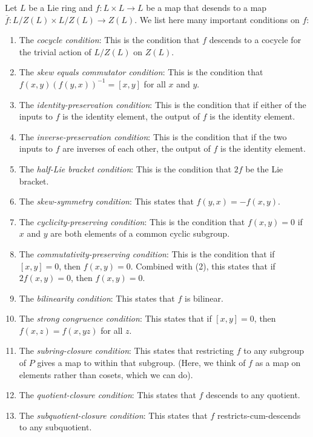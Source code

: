 \documentclass[10pt]{amsart}
\begin{document}
Let $L$ be a Lie ring and $f:L \times L \to L$ be a map that desends
to a map $\overline{f}: L/Z(L) \times L/Z(L) \to Z(L)$. We list here
many important conditions on $f$:

\begin{enumerate}
\item The {\em cocycle condition}: This is the condition that $f$
  descends to a cocycle for the trivial action of $L/Z(L)$ on $Z(L)$.
\item The {\em skew equals commutator condition}: This is the
  condition that $f(x,y)(f(y,x))^{-1} = [x,y]$ for all $x$ and $y$.
\item The {\em identity-preservation condition}: This is the condition
  that if either of the inputs to $f$ is the identity element, the
  output of $f$ is the identity element.
\item The {\em inverse-preservation condition}: This is the condition
  that if the two inputs to $f$ are inverses of each other, the output
  of $f$ is the identity element.
\item The {\em half-Lie bracket condition}: This is the condition that
  $2f$ be the Lie bracket.
\item The {\em skew-symmetry condition}: This states that $f(y,x) =
  -f(x,y)$.
\item The {\em cyclicity-preserving condition}: This is the condition
  that $f(x,y) = 0$ if $x$ and $y$ are both elements of a common
  cyclic subgroup.
\item The {\em commutativity-preserving condition}: This is the
  condition that if $[x,y] = 0$, then $f(x,y) = 0$. Combined with (2),
  this states that if $2f(x,y) = 0$, then $f(x,y) = 0$.
\item The {\em bilinearity condition}: This states that $f$ is
  bilinear.
\item The {\em strong congruence condition}: This states that if
  $[x,y] = 0$, then $f(x,z) = f(x,yz)$ for all $z$.
\item The {\em subring-closure condition}: This states that
  restricting $f$ to any subgroup of $P$ gives a map to within that
  subgroup. (Here, we think of $f$ as a map on elements rather than
  cosets, which we can do).
\item The {\em quotient-closure condition}: This states that $f$
  descends to any quotient.
\item The {\em subquotient-closure condition}: This states that $f$
  restricts-cum-descends to any subquotient.
\end{enumerate}
\end{document}
